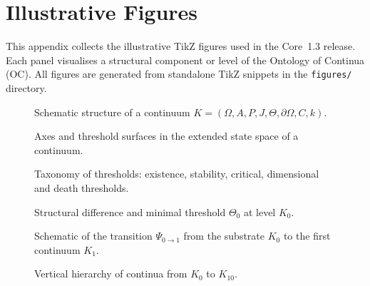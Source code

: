 
\section{Illustrative Figures}
\label{sec:figures}

This appendix collects the illustrative TikZ figures used in the Core~1.3
release. Each panel visualises a structural component or level of the
Ontology of Continua (OC). All figures are generated from standalone
TikZ snippets in the \texttt{figures/} directory.

\begin{figure}[p]
  \centering
  
  \caption{Schematic structure of a continuum
           \(K = (\Omega, A, P, J, \Theta, \partial\Omega, C, k)\).}
  \label{fig:continua-structure}
\end{figure}

\begin{figure}[p]
  \centering
  
  \caption{Axes and threshold surfaces in the extended state space of a
           continuum.}
  \label{fig:axes-thresholds}
\end{figure}

\begin{figure}[p]
  \centering
  
  \caption{Taxonomy of thresholds:
           existence, stability, critical, dimensional and death thresholds.}
  \label{fig:thresholds-taxonomy}
\end{figure}

\begin{figure}[p]
  \centering
  
  \caption{Structural difference and minimal threshold \texorpdfstring{\(\Theta_0\)}{\Theta_0} at level
           \texorpdfstring{\(K_0\)}{K_0}.}
  \label{fig:delta-threshold-k0}
\end{figure}

\begin{figure}[p]
  \centering
  
  \caption{Schematic of the transition \(\Psi_{0\to 1}\) from the substrate
           \(K_0\) to the first continuum \(K_1\).}
  \label{fig:k0-k1-transition}
\end{figure}

\begin{figure}[p]
  \centering
  
  \caption{Vertical hierarchy of continua from \texorpdfstring{\(K_0\)}{K_0} to \(K_{10}\).}
  \label{fig:levels-hierarchy}
\end{figure}

